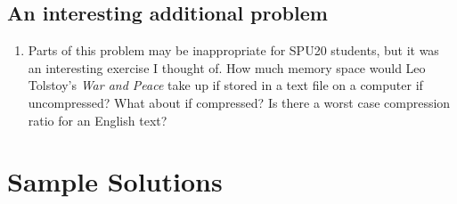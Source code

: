 \documentclass[12pt]{article}
\begin{document}
\subsection{An interesting additional problem}
\begin{enumerate}
\item Parts of this problem may be inappropriate for SPU20 students, but it was an interesting exercise I thought of. How much memory space would Leo Tolstoy's \textit{War and Peace} take up if stored in a text file on a computer if uncompressed? What about if compressed? Is there a worst case compression ratio for an English text?
\end{enumerate}

\section{Sample Solutions}
\end{document}

